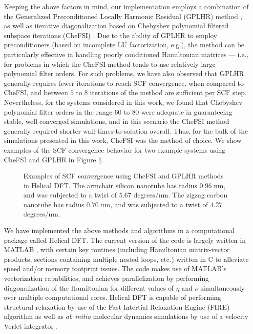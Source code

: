 \documentclass[preprint,12pt, 3p, sort&compress]{elsarticle}
\begin{document}
Keeping the above factors in mind, our implementation employs a combination of the Generalized Preconditioned Locally Harmonic Residual (GPLHR) method \citep{vecharynski2015generalized}, as well as iterative diagonalization based on Chebyshev polynomial filtered subspace iterations (CheFSI) \citep{zhou2014chebyshev,Serial_Chebyshev,Parallel_Chebyshev}. Due to the ability of  GPLHR to employ preconditioners (based on incomplete LU factorization, e.g.), the method can be particularly effective in handling poorly conditioned Hamiltonian matrices --- i.e., for problems in which the CheFSI method tends to use relatively large polynomial filter orders. For such problems, we have also observed that GPLHR generally requires fewer iterations to reach {SCF} convergence, when compared to CheFSI, and between $5$ to $8$ iterations of the method are sufficient per SCF step. Nevertheless, for the systems considered in this work, we found that Chebyshev polynomial filter orders in the range $60$ to $80$ were adequate in guaranteeing stable, well converged simulations, and in this scenario the CheFSI method generally required shorter wall-times-to-solution overall. Thus, for the bulk of the simulations presented in this work, CheFSI was the method of choice. We show examples of the SCF convergence behavior for two example systems using CheFSI and GPLHR in Figure \ref{fig:SCF_convergence}.
\begin{figure}[ht]
\centering
{}
\caption{Examples of SCF convergence using CheFSI and GPLHR methods in Helical DFT. The armchair silicon nanotube has radius $0.96$ nm, and was subjected to a twist of $5.67$ degrees/nm. The zigzag carbon nanotube has radius $0.70$ nm, and was subjected to a twist of $4.27$ degrees/nm.}
\label{fig:SCF_convergence}
\end{figure}

We have implemented the above methods and algorithms in a computational package called Helical DFT. The current version of the code is largely written in MATLAB \citep{MATLAB:2019}, with certain key routines (including Hamiltonian matrix-vector products, sections containing multiple nested loops, etc.) written in C to alleviate speed and/or memory footprint issues. The code makes use of MATLAB's vectorization capabilities, and achieves parallelization by performing diagonalization of the Hamiltonian for different values of $\eta$ and $\nu$ simultaneously over multiple computational cores. Helical DFT is capable of performing structural relaxation by use of the Fast Intertial Relaxation Engine (FIRE) algorithm \citep{bitzek2006structural} as well as \textit{ab initio} molecular dynamics simulations by use of a velocity Verlet integrator \citep{verlet1967computer}. 
\end{document}
